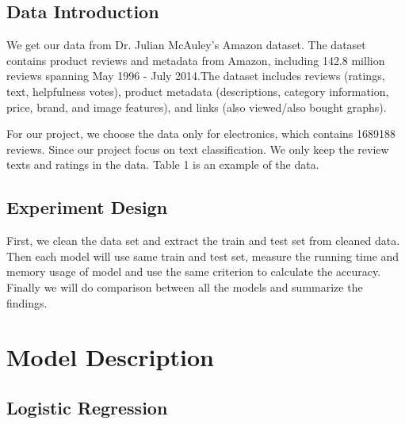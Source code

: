 \documentclass[letterpaper]{article} %
\begin{document}
\subsection{Data Introduction}
We get our data from Dr. Julian McAuley's Amazon dataset. The dataset contains product reviews and metadata from Amazon, including 142.8 million reviews spanning May 1996 - July 2014.The dataset includes reviews (ratings, text, helpfulness votes), product metadata (descriptions, category information, price, brand, and image features), and links (also viewed/also bought graphs). \par
For our project, we choose the data only for electronics, which contains 1689188 reviews. Since our project focus on text classification. We only keep the review texts and ratings in the data. Table 1 is an example of the data.\par
\begin{table}[htb]
\caption{Example of Amazon Review Data} %
\end{table}

\subsection{Experiment Design}

First, we clean the data set and extract the train and test set from cleaned data. Then each model will use same train and test set, measure the running time and memory usage of model and use the same criterion to calculate the accuracy. Finally we will do comparison between all the models and summarize the findings.

\section{Model Description}

\subsection{Logistic Regression}
\end{document}

